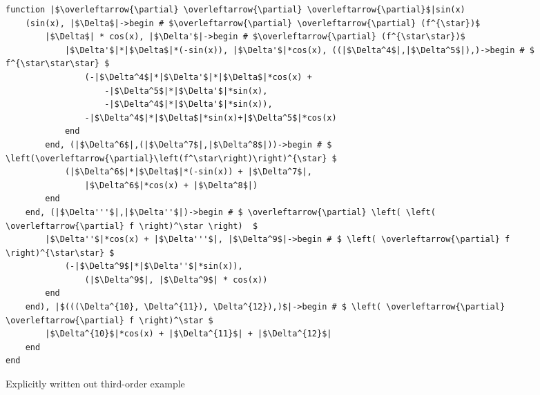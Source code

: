 \documentclass[letterpaper, 10 pt, conference]{ieeeconf}  %
\begin{document}
\begin{figure*}
\begin{verbatim}
function |$\overleftarrow{\partial} \overleftarrow{\partial} \overleftarrow{\partial}$|sin(x)
    (sin(x), |$\Delta$|->begin # $\overleftarrow{\partial} \overleftarrow{\partial} (f^{\star})$
        |$\Delta$| * cos(x), |$\Delta'$|->begin # $\overleftarrow{\partial} (f^{\star\star})$
            |$\Delta'$|*|$\Delta$|*(-sin(x)), |$\Delta'$|*cos(x), ((|$\Delta^4$|,|$\Delta^5$|),)->begin # $ f^{\star\star\star} $
                (-|$\Delta^4$|*|$\Delta'$|*|$\Delta$|*cos(x) +
                    -|$\Delta^5$|*|$\Delta'$|*sin(x),
                    -|$\Delta^4$|*|$\Delta'$|*sin(x)),
                -|$\Delta^4$|*|$\Delta$|*sin(x)+|$\Delta^5$|*cos(x)
            end
        end, (|$\Delta^6$|,(|$\Delta^7$|,|$\Delta^8$|))->begin # $ \left(\overleftarrow{\partial}\left(f^\star\right)\right)^{\star} $
            (|$\Delta^6$|*|$\Delta$|*(-sin(x)) + |$\Delta^7$|,
                |$\Delta^6$|*cos(x) + |$\Delta^8$|)
        end
    end, (|$\Delta'''$|,|$\Delta''$|)->begin # $ \overleftarrow{\partial} \left( \left( \overleftarrow{\partial} f \right)^\star \right)  $
        |$\Delta''$|*cos(x) + |$\Delta'''$|, |$\Delta^9$|->begin # $ \left( \overleftarrow{\partial} f \right)^{\star\star} $
            (-|$\Delta^9$|*|$\Delta''$|*sin(x)),
                (|$\Delta^9$|, |$\Delta^9$| * cos(x))
        end
    end), |$(((\Delta^{10}, \Delta^{11}), \Delta^{12}),)$|->begin # $ \left( \overleftarrow{\partial} \overleftarrow{\partial} f \right)^\star $
        |$\Delta^{10}$|*cos(x) + |$\Delta^{11}$| + |$\Delta^{12}$|
    end
end
\end{verbatim}
\caption{Explicitly written out third-order example}
\label{3-ordernaive}
\end{figure*}


{}
\end{document}
